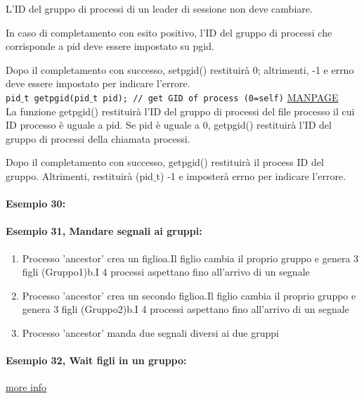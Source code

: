 L'ID del gruppo di processi di un leader di sessione non deve cambiare.

In caso di completamento con esito positivo, l'ID del gruppo di processi che corrisponde a pid deve essere impostato su pgid.

Dopo il completamento con successo, setpgid() restituirà 0; altrimenti,
-1 e errno deve essere impostato per indicare l'errore.\\
       
\texttt{pid$\_$t getpgid(pid$\_$t pid); // get GID of process (0=self)} \href{https://www.man7.org/linux/man-pages/man3/getpgid.3p.html}{MANPAGE}\\
La funzione getpgid() restituirà l'ID del gruppo di processi del file
processo il cui ID processo è uguale a pid. Se pid è uguale a 0,
getpgid() restituirà l'ID del gruppo di processi della chiamata
processi.

Dopo il completamento con successo, getpgid() restituirà il process ID del gruppo. Altrimenti, restituirà (pid$\_$t) -1 e imposterà errno per indicare l'errore. \\
 \paragraph{Esempio 30:}\hfill \break


\paragraph{Esempio 31, Mandare segnali ai gruppi:}\hfill \break


\begin{enumerate}
    \item Processo 'ancestor' crea un figlioa.Il figlio cambia il proprio gruppo e genera 3 figli (Gruppo1)b.I 4 processi aspettano fino all'arrivo di un segnale
    \item Processo 'ancestor' crea un secondo figlioa.Il figlio cambia il proprio gruppo e genera 3 figli (Gruppo2)b.I 4 processi aspettano fino all'arrivo di un segnale
    \item Processo 'ancestor' manda due segnali diversi ai due gruppi
\end{enumerate}


\paragraph{Esempio 32, Wait figli in un gruppo:}\hfill \break


\href{https://linux.die.net/man/2/setpgid}{more info}
